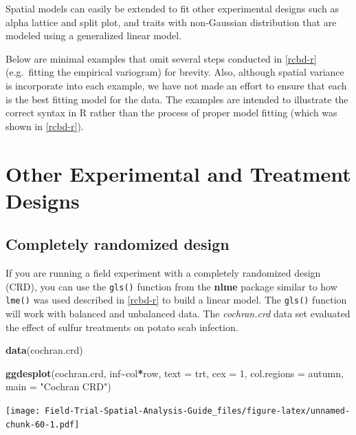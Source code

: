 \documentclass[
]{book}
\newenvironment{Shaded}{\begin{snugshade}}{\end{snugshade}}
\newcommand{\AttributeTok}[1]{\textcolor[rgb]{0.13,0.29,0.53}{#1}}
\newcommand{\DecValTok}[1]{\textcolor[rgb]{0.00,0.00,0.81}{#1}}
\newcommand{\FunctionTok}[1]{\textcolor[rgb]{0.13,0.29,0.53}{\textbf{#1}}}
\newcommand{\NormalTok}[1]{#1}
\newcommand{\SpecialCharTok}[1]{\textcolor[rgb]{0.81,0.36,0.00}{\textbf{#1}}}
\newcommand{\StringTok}[1]{\textcolor[rgb]{0.31,0.60,0.02}{#1}}
\begin{document}
Spatial models can easily be extended to fit other experimental designs such as alpha lattice and split plot, and traits with non-Gaussian distribution that are modeled using a generalized linear model.

Below are minimal examples that omit several steps conducted in \ref{rcbd-r} (e.g.~fitting the empirical variogram) for brevity. Also, although spatial variance is incorporate into each example, we have not made an effort to ensure that each is the best fitting model for the data. The examples are intended to illustrate the correct syntax in R rather than the process of proper model fitting (which was shown in \ref{rcbd-r}).

\hypertarget{other-experimental-and-treatment-designs}{%
\section{Other Experimental and Treatment Designs}\label{other-experimental-and-treatment-designs}}

\hypertarget{completely-randomized-design}{%
\subsection{Completely randomized design}\label{completely-randomized-design}}

If you are running a field experiment with a completely randomized design (CRD), you can use the \texttt{gls()} function from the \textbf{nlme} package similar to how \texttt{lme()} was used described in \ref{rcbd-r} to build a linear model. The \texttt{gls()} function will work with balanced and unbalanced data.
The \emph{cochran.crd} data set evaluated the effect of sulfur treatments on potato scab infection.

\begin{Shaded}
\begin{Highlighting}[]
\FunctionTok{data}\NormalTok{(cochran.crd)}

\FunctionTok{ggdesplot}\NormalTok{(cochran.crd, inf}\SpecialCharTok{\textasciitilde{}}\NormalTok{col}\SpecialCharTok{*}\NormalTok{row,}
        \AttributeTok{text =}\NormalTok{ trt, }\AttributeTok{cex =} \DecValTok{1}\NormalTok{, }\AttributeTok{col.regions =}\NormalTok{ autumn, }
        \AttributeTok{main =} \StringTok{"Cochran CRD"}\NormalTok{)}
\end{Highlighting}
\end{Shaded}

\texttt{[image: Field-Trial-Spatial-Analysis-Guide\_files/figure-latex/unnamed-chunk-60-1.pdf]}
\end{document}
